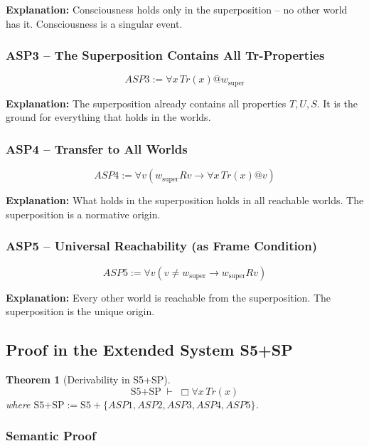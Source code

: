 \documentclass[
]{article}
\newtheorem{theorem}{Theorem}
\begin{document}
\textbf{Explanation:} Consciousness holds only in the superposition – no other world has it. Consciousness is a singular event.

\subsubsection{ASP3 – The Superposition Contains All Tr-Properties}

\[
\boxed{ASP3 := \forall x\,Tr(x) @ w_{\text{super}}}
\]

\textbf{Explanation:} The superposition already contains all properties \(T, U, S\). It is the ground for everything that holds in the worlds.

\subsubsection{ASP4 – Transfer to All Worlds}

\[
\boxed{ASP4 := \forall v (w_{\text{super}} R v \rightarrow \forall x\,Tr(x) @ v)}
\]

\textbf{Explanation:} What holds in the superposition holds in all reachable worlds. The superposition is a normative origin.

\subsubsection{ASP5 – Universal Reachability (as Frame Condition)}

\[
\boxed{ASP5 := \forall v (v \neq w_{\text{super}} \rightarrow w_{\text{super}} R v)}
\]

\textbf{Explanation:} Every other world is reachable from the superposition. The superposition is the unique origin.

\subsection{Proof in the Extended System S5+SP}

\begin{theorem}[Derivability in S5+SP]
\[
\boxed{
\text{S5+SP} \;\vdash\; \Box\forall x\,Tr(x)
}
\]
where \(\text{S5+SP} := \text{S5} + \{ASP1, ASP2, ASP3, ASP4, ASP5\}\).
\end{theorem}

\subsubsection{Semantic Proof}
\end{document}
